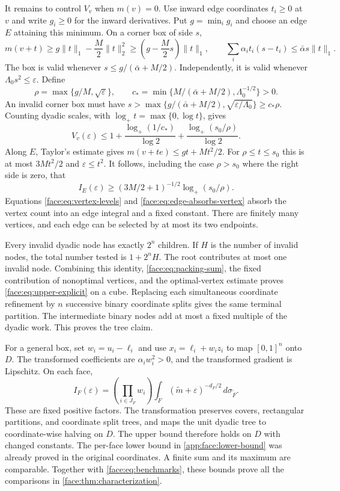 It remains to control $V_v$ when $m(v)=0$.  Use inward edge
coordinates $t_i\ge0$ at $v$ and write $g_i\ge0$ for the inward
derivatives.  Put $g=\min_i g_i$ and choose an edge $E$ attaining
this minimum.  On a corner box of side $s$,
\[
 m(v+t)\ge g\|t\|_1-\frac M2\|t\|_2^2
          \ge\left(g-\frac M2s\right)\|t\|_1,
 \qquad
 \sum_i\alpha_i t_i(s-t_i)\le\bar\alpha s\|t\|_1.
\]
The box is valid whenever
$s\le g/(\bar\alpha+M/2)$.  Independently, it is valid whenever
$\Lambda_0s^2\le\varepsilon$.  Define
\[
 \rho=\max\{g/M,\sqrt\varepsilon\},\qquad
 c_* = \min\{M/(\bar\alpha+M/2),\Lambda_0^{-1/2}\}>0.
\]
An invalid corner box must have
$s>\max\{g/(\bar\alpha+M/2),\sqrt{\varepsilon/\Lambda_0}\}
\ge c_*\rho$.  Counting dyadic scales, with
$\log_+t=\max\{0,\log t\}$, gives
\begin{equation}
 \label{face:eq:vertex-levels}
 V_v(\varepsilon)
 \le1+\frac{\log_+(1/c_*)}{\log2}
       +\frac{\log_+(s_0/\rho)}{\log2}.
\end{equation}
Along $E$, Taylor's estimate gives
$m(v+te)\le gt+Mt^2/2$.
For $\rho\le t\le s_0$ this is at most $3Mt^2/2$ and
$\varepsilon\le t^2$.  It follows, including the case
$\rho>s_0$ where the right side is zero, that
\begin{equation}
 \label{face:eq:edge-absorbs-vertex}
 I_E(\varepsilon)
 \ge(3M/2+1)^{-1/2}\log_+(s_0/\rho).
\end{equation}
Equations \eqref{face:eq:vertex-levels} and
\eqref{face:eq:edge-absorbs-vertex} absorb the vertex count into an
edge integral and a fixed constant.  There are finitely many vertices,
and each edge can be selected by at most its two endpoints.

Every invalid dyadic node has exactly $2^n$ children.  If $H$ is the
number of invalid nodes, the total number tested is $1+2^nH$.
The root contributes at most one invalid node.  Combining this identity,
\eqref{face:eq:packing-sum}, the fixed contribution of nonoptimal
vertices, and the optimal-vertex estimate proves
\eqref{face:eq:upper-explicit} on a cube.  Replacing each simultaneous
coordinate refinement by $n$ successive binary coordinate splits gives
the same terminal partition.  The intermediate binary nodes add at most
a fixed multiple of the dyadic work.  This proves the tree claim.

For a general box, set $w_i=u_i-\ell_i$ and use
$x_i=\ell_i+w_i z_i$ to map $[0,1]^n$ onto $D$.
The transformed coefficients are $\alpha_iw_i^2>0$, and the transformed
gradient is Lipschitz.  On each face,
\[
 I_F(\varepsilon)=
 \left(\prod_{i\in J_F}w_i\right)
 \int_{\widetilde F}(\widetilde m+\varepsilon)^{-d_F/2}
      \,d\sigma_{\widetilde F}.
\]
These are fixed positive factors.  The transformation preserves covers,
rectangular partitions, and coordinate split trees, and maps the unit
dyadic tree to coordinate-wise halving on $D$.
The upper bound therefore holds on $D$ with changed constants.
The per-face lower bound in \cref{app:face:lower-bound} was already
proved in the original coordinates.  A finite sum and its maximum are
comparable.  Together with
\eqref{face:eq:benchmarks}, these bounds prove all the comparisons in
\cref{face:thm:characterization}.

